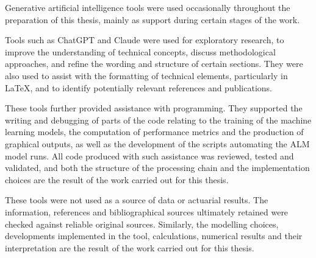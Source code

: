Generative artificial intelligence tools were used occasionally throughout the preparation
of this thesis, mainly as support during certain stages of the work.

Tools such as ChatGPT and Claude were used for exploratory research, to improve the
understanding of technical concepts, discuss methodological approaches, and refine the
wording and structure of certain sections. They were also used to assist with the formatting
of technical elements, particularly in \LaTeX{}, and to identify potentially relevant
references and publications.

These tools further provided assistance with programming. They supported the writing and
debugging of parts of the code relating to the training of the machine learning models, the
computation of performance metrics and the production of graphical outputs, as well as the
development of the scripts automating the ALM model runs. All code produced with such
assistance was reviewed, tested and validated, and both the structure of the processing
chain and the implementation choices are the result of the work carried out for this thesis.

These tools were not used as a source of data or actuarial results. The information,
references and bibliographical sources ultimately retained were checked against reliable
original sources. Similarly, the modelling choices, developments implemented in the tool,
calculations, numerical results and their interpretation are the result of the work carried
out for this thesis.